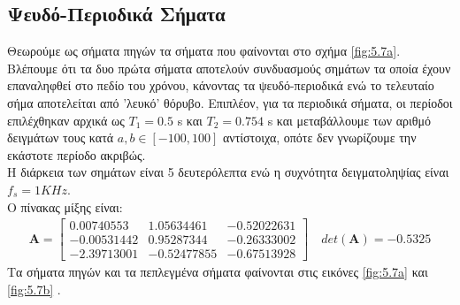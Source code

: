\subsection{Ψευδό-Περιοδικά Σήματα}
\justifying
Θεωρούμε ως σήματα πηγών τα σήματα που φαίνονται στο σχήμα \ref{fig:5.7a}.
Βλέπουμε ότι τα δυο πρώτα σήματα αποτελούν συνδυασμούς σημάτων τα οποία έχουν επαναληφθεί στο πεδίο του χρόνου, κάνοντας τα ψευδό-περιοδικά ενώ το τελευταίο σήμα αποτελείται από 'λευκό' θόρυβο. Επιπλέον, για τα περιοδικά σήματα, οι περίοδοι επιλέχθηκαν αρχικά ως \en $T_1 = 0.5$ s \gr και \en $T_2 = 0.754$ s \gr και μεταβάλλουμε των αριθμό δειγμάτων τους κατά $a , b \in [-100 , 100]$ αντίστοιχα, οπότε δεν γνωρίζουμε την εκάστοτε περίοδο ακριβώς.
\\
Η διάρκεια των σημάτων είναι 5 δευτερόλεπτα ενώ η συχνότητα δειγματοληψίας είναι \en $f_s = 1 KHz$.\gr 
\\
Ο πίνακας μίξης είναι: \en
\begin{align*}
    \mathbf{A} = \begin{bmatrix}
    0.00740553 &  1.05634461 & -0.52022631 \\
    -0.00531442 &  0.95287344 & -0.26333002 \\
    -2.39713001 & -0.52477855 & -0.67513928 
    \end{bmatrix} \quad det(\mathbf{A}) = -0.5325
\end{align*}
\gr 
Τα σήματα πηγών και τα πεπλεγμένα σήματα φαίνονται στις εικόνες \en \ref{fig:5.7a} \gr και \en \ref{fig:5.7b} \gr.

